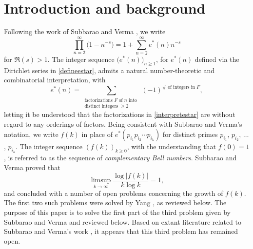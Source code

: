 \documentclass[11pt,letterpaper]{amsart}
\begin{document}
\section{Introduction and background}
 Following the work of Subbarao and Verma \cite{SubbaraoVerma2001}, we write 
\begin{equation}\label{defineestar}
 \prod_{n=2}^{\infty} \big( 1 - n^{-s} \big) = 1 + \sum_{n=2}^{\infty} 
 e^{\ast}(n) n^{-s} 
\end{equation}
 for $\Re(s) > 1$. The integer sequence $\big( e^{\ast}(n) \big)_{n \geq 1}$, for $e^{\ast}(n)$ defined via the Dirichlet series in 
 \eqref{defineestar}, admits a natural number-theoretic and combinatorial interpretation, with 
\begin{equation}\label{interpretestar} 
 e^{\ast}(n) = \sum_{\substack{\text{factorizations $F$ of $n$ into } \\ \text{distinct integers $\geq 2$} }} 
 (-1)^{\text{$\#$ of integers in $F$}}, 
\end{equation} 
 letting it be understood that the factorizations in \eqref{interpretestar} are without regard to any orderings of factors. Being consistent 
 with Subbarao and Verma's notation, we write $f(k)$ in place of $e^{\ast}( p_{i_1} p_{i_2} \cdots p_{i_k} )$ for distinct primes $p_{i_1}$, 
 $p_{i_2}$, $\ldots$, $p_{i_k}$. The integer sequence $(f(k))_{k \geq 0}$, with the understanding that $f(0) = 1$, is referred to as the 
 sequence of \emph{complementary Bell numbers}. Subbarao and Verma proved that 
\begin{equation}\label{limsupf}
 \limsup_{k\to \infty} \frac{\log|f(k)|}{k \log k} = 1, 
\end{equation}
 and concluded with a number of open problems concerning the growth of $f(k)$.   The first two such problems were solved by Yang  
  \cite{Yang2001}, as reviewed below.    The purpose of this paper is to solve the first part of the third problem given by 
 Subbarao and Verma and reviewed below. 
 Based on extant literature related to Subbarao and Verma's work 
 \cite{AmdeberhanDeAngelisMoll2013,DeAngelisMarcello2016,DeWannemackerLaffeyOsburn2007,KataiSubbarao2006,Klazar2003Bell,Klazar2003Counting,Yang2001} \cite[\S3.2]{Mezo2020}, 
 it appears that this third problem has remained open. 
\end{document}
